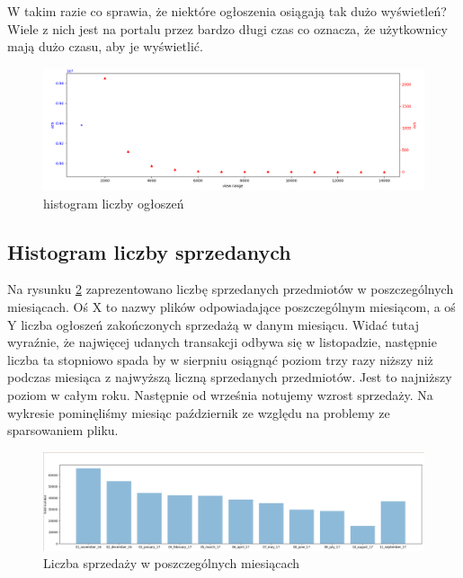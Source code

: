 \documentclass[a4paper,11pt]{article}
\begin{document}
W takim razie co sprawia, że niektóre ogłoszenia osiągają tak dużo wyświetleń? Wiele z nich jest na portalu przez bardzo długi czas co oznacza, że użytkownicy mają dużo czasu, aby je wyświetlić.

\begin{figure}[!ht]
\centering
\includegraphics[width=1.0\textwidth]{images/liczba_ogloszen_Liczba_wyswietlen.png}
\caption{\label{fig:adsViewsNumber} histogram liczby ogłoszeń}
\end{figure}

\subsection{Histogram liczby sprzedanych}
Na rysunku \ref{fig:soldNumber} zaprezentowano liczbę sprzedanych przedmiotów w poszczególnych miesiącach. Oś X to nazwy plików odpowiadające poszczególnym miesiącom, a oś Y liczba ogłoszeń zakończonych sprzedażą w danym miesiącu. Widać tutaj wyraźnie, że najwięcej udanych transakcji odbywa się w listopadzie, następnie liczba ta stopniowo spada by w sierpniu osiągnąć poziom trzy razy niższy niż podczas miesiąca z najwyższą liczną sprzedanych przedmiotów. Jest to najniższy poziom w całym roku. Następnie od września notujemy wzrost sprzedaży. Na wykresie pominęliśmy miesiąc październik ze względu na problemy ze sparsowaniem pliku.

\begin{figure}[!ht]
\centering
\includegraphics[width=1.0\textwidth]{images/sold_number.png}
\caption{\label{fig:soldNumber} Liczba sprzedaży w poszczególnych miesiącach}
\end{figure}
\end{document}
